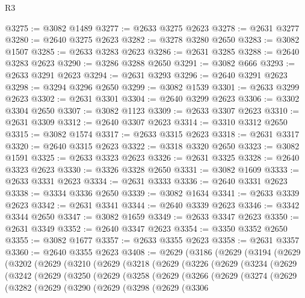 \begin{lexlean}{R3}
\begin{coremodule}
@3275 := @3082 @1489
@3277 := @2633 @3275 @2623
@3278 := @2631 @3277
@3280 := @2640 @3275 @2623
@3282 := @3278 @3280 @2650
@3283 := @3082 @1507
@3285 := @2633 @3283 @2623
@3286 := @2631 @3285
@3288 := @2640 @3283 @2623
@3290 := @3286 @3288 @2650
@3291 := @3082 @666
@3293 := @2633 @3291 @2623
@3294 := @2631 @3293
@3296 := @2640 @3291 @2623
@3298 := @3294 @3296 @2650
@3299 := @3082 @1539
@3301 := @2633 @3299 @2623
@3302 := @2631 @3301
@3304 := @2640 @3299 @2623
@3306 := @3302 @3304 @2650
@3307 := @3082 @1123
@3309 := @2633 @3307 @2623
@3310 := @2631 @3309
@3312 := @2640 @3307 @2623
@3314 := @3310 @3312 @2650
@3315 := @3082 @1574
@3317 := @2633 @3315 @2623
@3318 := @2631 @3317
@3320 := @2640 @3315 @2623
@3322 := @3318 @3320 @2650
@3323 := @3082 @1591
@3325 := @2633 @3323 @2623
@3326 := @2631 @3325
@3328 := @2640 @3323 @2623
@3330 := @3326 @3328 @2650
@3331 := @3082 @1609
@3333 := @2633 @3331 @2623
@3334 := @2631 @3333
@3336 := @2640 @3331 @2623
@3338 := @3334 @3336 @2650
@3339 := @3082 @1634
@3341 := @2633 @3339 @2623
@3342 := @2631 @3341
@3344 := @2640 @3339 @2623
@3346 := @3342 @3344 @2650
@3347 := @3082 @1659
@3349 := @2633 @3347 @2623
@3350 := @2631 @3349
@3352 := @2640 @3347 @2623
@3354 := @3350 @3352 @2650
@3355 := @3082 @1677
@3357 := @2633 @3355 @2623
@3358 := @2631 @3357
@3360 := @2640 @3355 @2623
@3408 := @2629
    (@3186
      (@2629
        (@3194
          (@2629
            (@3202
              (@2629
                (@3210
                  (@2629
                    (@3218
                      (@2629
                        (@3226
                          (@2629
                            (@3234
                              (@2629
                                (@3242
                                  (@2629
                                    (@3250
                                      (@2629
                                        (@3258
                                          (@2629
                                            (@3266
                                              (@2629
                                                (@3274
                                                  (@2629
                                                    (@3282
                                                      (@2629
                                                        (@3290
                                                          (@2629
                                                            (@3298
                                                              (@2629
                                                                (@3306

\end{coremodule}
\end{lexlean}
